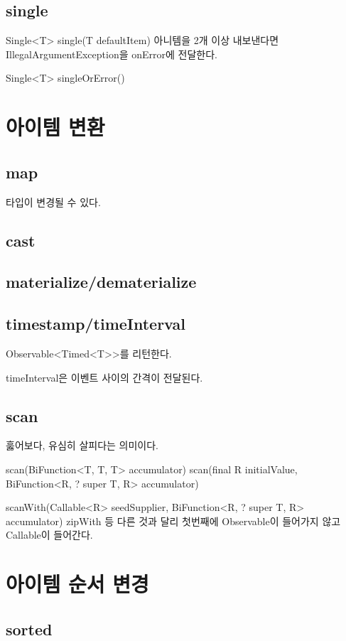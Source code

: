\documentclass{book}
\begin{document}
{\subsection{single}
Single<T> single(T defaultItem)
아니템을 2개 이상 내보낸다면 IllegalArgumentException을 onError에 전달한다.

Single<T> singleOrError()

\section{아이템 변환}
\subsection{map}
타입이 변경될 수 있다.



\subsection{cast}

\subsection{materialize/dematerialize}

\subsection{timestamp/timeInterval}
Observable<Timed<T>>를 리턴한다.

timeInterval은 이벤트 사이의 간격이 전달된다.

\subsection{scan}
훓어보다, 유심히 살피다는 의미이다.

scan(BiFunction<T, T, T> accumulator)
scan(final R initialValue, BiFunction<R, ? super T, R> accumulator)

scanWith(Callable<R> seedSupplier, BiFunction<R, ? super T, R> accumulator)
zipWith 등 다른 것과 달리 첫번째에 Observable이 들어가지 않고 Callable이 들어간다.

\section{아이템 순서 변경}
\subsection{sorted}





}
\end{document}
